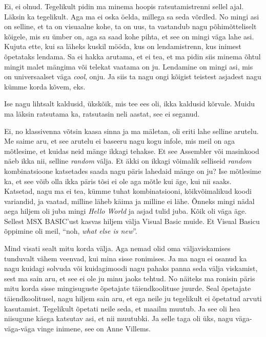 Ei, ei olnud. Tegelikult pidin ma minema hoopis ratsutamistrenni sellel ajal. 
Läksin ka tegelikult. Aga ma ei oska öelda, millega sa seda võrdled. No mingi 
asi on selline, et  ta on visuaalne kohe, ta on uus, ta vastandub nagu 
põhimõtteliselt kõigele, mis su ümber on, aga sa saad kohe pihta, et see on 
mingi väga lahe asi. Kujuta ette, kui sa läheks kuskil mööda, kus on 
lendamistrenn, kus inimest õpetataks lendama. Sa ei  hakka arutama, et ei tea, 
et ma pidin siis minema õhtul mingit malet mängima või telekat vaatama on ju.  
Lendamine on  mingi asi, mis on universaalset väga \emph{cool}, onju. Ja siis 
ta nagu ongi kõigist teistest asjadest nagu kümme korda kõvem, eks.


Ise nagu lihtsalt kaldusid,  ükskõik, mis tee ees oli, ikka kaldusid kõrvale. 
Muidu ma läksin ratsutama ka, ratsutasin neli aastat, see ei seganud.

Ei, no klassivenna võtsin kaasa sinna ja ma mäletan, oli eriti lahe selline 
arutelu. Me saime aru, et see arutelu ei baseeru nagu kogu infole, mis meil on 
aga mõtlesime, et kuidas neid mänge ikkagi tehakse. Et see Assembler või 
masinkood näeb ikka nii, selline \emph{random} välja. Et äkki on ikkagi 
võimalik selliseid \emph{random} kombinatsioone katsetades saada nagu päris 
lahedaid mänge on ju? Ise mõtlesime ka, et see võib olla ikka päris tõsi ei ole 
aga mõtle kui äge, kui nii saaks. Katsetad, nagu ma ei tea, kümme tuhat 
kombinatsiooni, kõikvõimalikud koodi variandid, ja vaatad,  milline läheb käima 
ja milline ei lähe. Õnneks mingi nädal aega hiljem oli juba mingi \emph{Hello 
World} ja asjad tulid juba. Kõik oli  väga äge. Sellest MSX 
BASIC'ust  kasvas hiljem välja Visual 
Basic muide. Et Visual Basicu õppimine oli meil, 
\enquote{noh, \emph{what else is new}}.


Mind visati sealt mitu korda välja. Aga nemad olid oma väljaviskamises 
tunduvalt vähem veenvad, kui mina sisse ronimises. Ja ma nagu ei osanud ka nagu 
kuidagi solvuda või kuidagimoodi nagu pahaks panna seda välja viskamist, sest 
ma sain aru, et see ei ole ju minu jaoks tehtud. No näiteks ma ronisin päris 
mitu korda sisse mingisuguste õpetajate täiendkoolituse juurde. Seal õpetajate 
täiendkoolitusel, nagu hiljem sain aru, et ega neile  ju tegelikult ei õpetatud 
arvuti kasutamist. Tegelikult õpetati neile seda, et maailm muutub. Ja see oli 
hea niisugune käega katsutav asi, et nii muutubki. Ja selle taga oli üks, nagu 
väga-väga-väga vinge inimene, see on Anne Villems.

